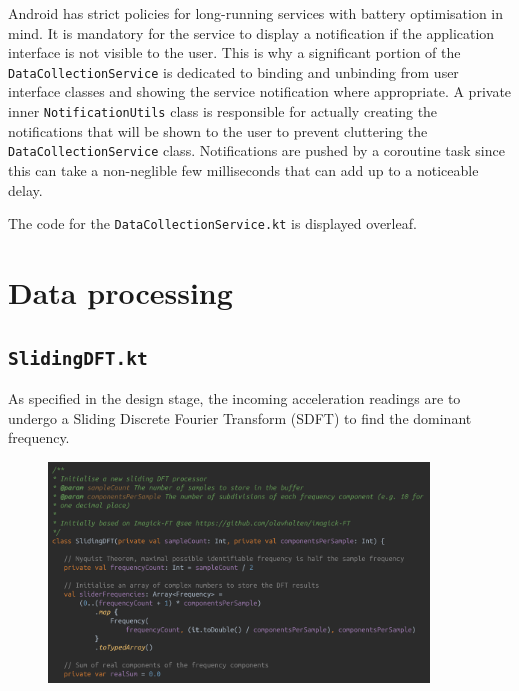 \documentclass[11pt,twoside,a4paper]{report}
\begin{document}
Android has strict policies for long-running services with battery optimisation in mind. It is mandatory for the service to display a notification if the application interface is not visible to the user. This is why a significant portion of the \texttt{DataCollectionService} is dedicated to binding and unbinding from user interface classes and showing the service notification where appropriate. A private inner \texttt{NotificationUtils} class is responsible for actually creating the notifications that will be shown to the user to prevent cluttering the \texttt{DataCollectionService} class. Notifications are pushed by a coroutine task since this can take a non-neglible few milliseconds that can add up to a noticeable delay.

The code for the \texttt{DataCollectionService.kt} is displayed overleaf.



\section{Data processing}

\subsection{\texttt{SlidingDFT.kt}}

As specified in the design stage, the incoming acceleration readings are to undergo a Sliding Discrete Fourier Transform (SDFT) to find the dominant frequency.

\begin{figure}[h!]
  \centering
  \includegraphics[width=0.9\textwidth]{code-slidingDFT.png}
  \caption{}
  \label{fig:slidingDFT}
\end{figure}
\end{document}
